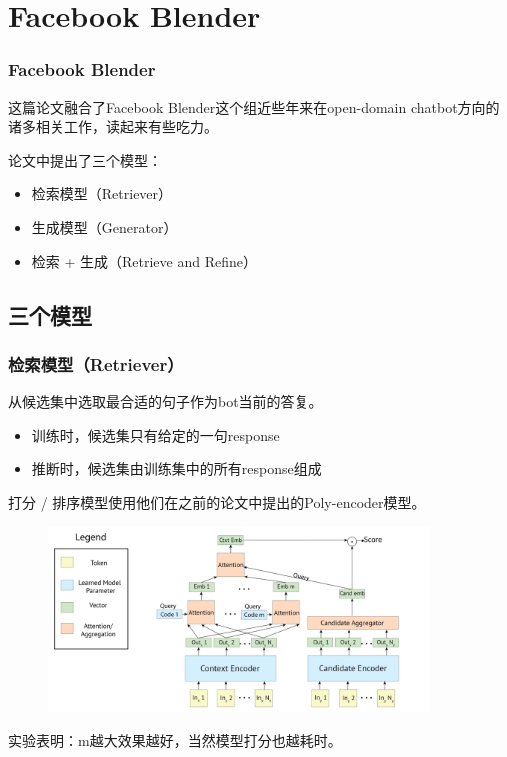 \documentclass{beamer}
\begin{document}
\section{Facebook Blender}

\begin{frame}

    \frametitle{Facebook Blender}

    这篇论文融合了Facebook Blender这个组近些年来在open-domain chatbot方向的诸多相关工作，读起来有些吃力。

    论文中提出了三个模型：

    \begin{itemize}
        \item 检索模型（Retriever）
        \item 生成模型（Generator）
        \item 检索 + 生成（Retrieve and Refine）
    \end{itemize}
\end{frame}

\subsection{三个模型}
\begin{frame}
    \frametitle{检索模型（Retriever）}

    从候选集中选取最合适的句子作为bot当前的答复。

    \begin{itemize}
        \item 训练时，候选集只有给定的一句response
        \item 推断时，候选集由训练集中的所有response组成
    \end{itemize}

    打分 / 排序模型使用他们在之前的论文中提出的Poly-encoder模型。

    \begin{figure}
        \centering
        \includegraphics[width=0.9\textwidth]{fig/Poly-encoder.png}
    \end{figure}

    实验表明：m越大效果越好，当然模型打分也越耗时。
\end{frame}
\end{document}
